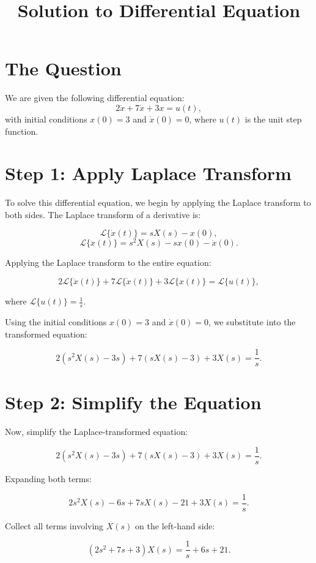 \documentclass{article}
\begin{document}
\title{Solution to Differential Equation}
\date{}
\maketitle

\section*{The Question}
We are given the following differential equation:
\[
2\ddot{x} + 7\dot{x} + 3x = u(t),
\]
with initial conditions \(x(0) = 3\) and \(\dot{x}(0) = 0\), where \(u(t)\) is the unit step function.

\section*{Step 1: Apply Laplace Transform}

To solve this differential equation, we begin by applying the Laplace transform to both sides. The Laplace transform of a derivative is:

\[
\mathcal{L}\{\dot{x}(t)\} = sX(s) - x(0),
\]
\[
\mathcal{L}\{\ddot{x}(t)\} = s^2 X(s) - s x(0) - \dot{x}(0).
\]

Applying the Laplace transform to the entire equation:

\[
2\mathcal{L}\{\ddot{x}(t)\} + 7\mathcal{L}\{\dot{x}(t)\} + 3\mathcal{L}\{x(t)\} = \mathcal{L}\{u(t)\},
\]

where \(\mathcal{L}\{u(t)\} = \frac{1}{s}\).

Using the initial conditions \(x(0) = 3\) and \(\dot{x}(0) = 0\), we substitute into the transformed equation:

\[
2(s^2 X(s) - 3s) + 7(s X(s) - 3) + 3X(s) = \frac{1}{s}.
\]

\section*{Step 2: Simplify the Equation}

Now, simplify the Laplace-transformed equation:

\[
2(s^2 X(s) - 3s) + 7(s X(s) - 3) + 3X(s) = \frac{1}{s}.
\]

Expanding both terms:

\[
2s^2 X(s) - 6s + 7sX(s) - 21 + 3X(s) = \frac{1}{s}.
\]

Collect all terms involving \(X(s)\) on the left-hand side:

\[
(2s^2 + 7s + 3)X(s) = \frac{1}{s} + 6s + 21.
\]
\end{document}
